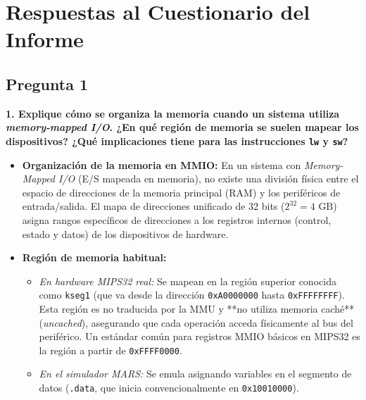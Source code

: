 \documentclass[12pt, letterpaper]{article}
\begin{document}
\section{Respuestas al Cuestionario del Informe}

\subsection*{Pregunta 1}
\textbf{1. Explique cómo se organiza la memoria cuando un sistema utiliza \textit{memory-mapped I/O}. ¿En qué región de memoria se suelen mapear los dispositivos? ¿Qué implicaciones tiene para las instrucciones \texttt{lw} y \texttt{sw}?}

\begin{itemize}
    \item \textbf{Organización de la memoria en MMIO:} En un sistema con \textit{Memory-Mapped I/O} (E/S mapeada en memoria), no existe una división física entre el espacio de direcciones de la memoria principal (RAM) y los periféricos de entrada/salida. El mapa de direcciones unificado de 32 bits ($2^{32} = 4\text{ GB}$) asigna rangos específicos de direcciones a los registros internos (control, estado y datos) de los dispositivos de hardware.
    
    \item \textbf{Región de memoria habitual:}
    \begin{itemize}
        \item \textit{En hardware MIPS32 real:} Se mapean en la región superior conocida como \texttt{kseg1} (que va desde la dirección \texttt{0xA0000000} hasta \texttt{0xFFFFFFFF}). Esta región es no traducida por la MMU y **no utiliza memoria caché** (\textit{uncached}), asegurando que cada operación acceda físicamente al bus del periférico. Un estándar común para registros MMIO básicos en MIPS32 es la región a partir de \texttt{0xFFFF0000}.
        \item \textit{En el simulador MARS:} Se emula asignando variables en el segmento de datos (\texttt{.data}, que inicia convencionalmente en \texttt{0x10010000}).
    \end{itemize}
    

\end{itemize}
\end{document}

